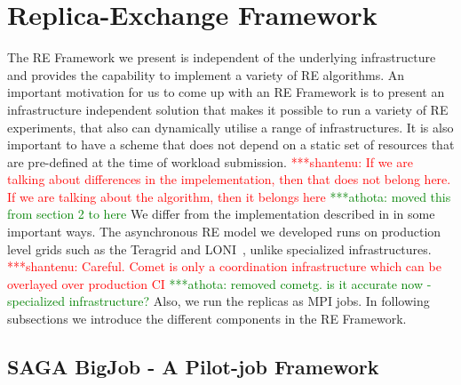 \documentclass{rspublic}
\newcommand{\jhanote}[1]{ {\textcolor{red} { ***shantenu: #1 }}}
\newcommand{\alnote}[1]{ {\textcolor{blue} { ***andre: #1 }}}
\newcommand{\athotanote}[1]{ {\textcolor{green} { ***athota: #1 }}}
\newcommand{\alnote}[1]{}
\newcommand{\athotanote}[1]{}
\newcommand{\jhanote}[1]{}
\begin{document}



\section{Replica-Exchange Framework}

The RE Framework we present is independent of the underlying infrastructure and provides the capability to implement a variety of RE algorithms. 
An important motivation for us to come up with an RE Framework is to present an infrastructure independent solution that makes it possible to run a variety of RE experiments, that also can dynamically utilise a range of infrastructures.
 It is also important to have a scheme
that does not depend on a static set of resources that are pre-defined
at the time of workload submission.  
\jhanote{If we are talking about differences in the impelementation,
  then that does not belong here. If we are talking about the
  algorithm, then it belongs here} \athotanote{moved this from section 2 to here}
   We differ from the implementation described
in \citep{parashar_arepex} in some important ways.  The asynchronous
RE model we developed runs on production level grids such as the
Teragrid and LONI~\citep{LONI_web}, unlike specialized
infrastructures. \jhanote{Careful. Comet is only a
  coordination infrastructure which can be overlayed over production
  CI} \athotanote{removed cometg. is it accurate now - specialized infrastructure?} Also, we run the replicas as MPI jobs. In following subsections we introduce the different components in the RE Framework. 
  
  

\subsection{SAGA BigJob - A Pilot-job Framework}
\label{sec:BigJob}
\end{document}
